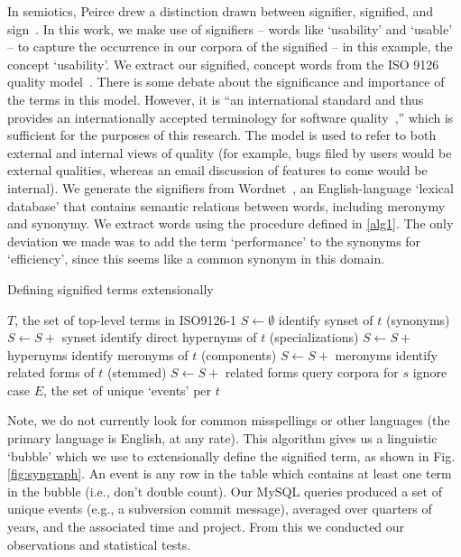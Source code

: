\documentclass[conference, compsoc]{IEEEtran}
\begin{document}
In semiotics, Peirce drew a distinction drawn between signifier, signified, and sign~\cite{atkin2006}. In this work, we make use of signifiers -- words like `usability' and `usable' -- to capture the occurrence in our corpora of the signified -- in this example, the concept `usability'. We extract our signified, concept words from the ISO 9126 quality model~\cite{iso9126}. There is some debate about the significance and importance of the terms in this model. However, it is ``an international standard and thus provides an internationally accepted terminology for software quality~\cite[p. 58]{Boegh2008},'' which is sufficient for the purposes of this research. The model is used to refer to both external and internal views of quality (for example, bugs filed by users would be external qualities, whereas an email discussion of features to come would be internal). We generate the signifiers from Wordnet~\cite{Fellbaum1998}, an English-language `lexical database' that contains semantic relations between words, including meronymy and synonymy. We extract words using the procedure defined in \ref{alg1}. The only deviation we made was to add the term `performance' to the synonyms for `efficiency', since this seems like a common synonym in this domain.%

\renewcommand{\algorithmiccomment}[1]{// #1}
\begin{algorithm}[H]
\caption{Defining signified terms extensionally}
  \label{alg1}
\begin{algorithmic}
	\REQUIRE $T$, the set of top-level terms in ISO9126-1
	\STATE $S \leftarrow \emptyset $
	\STATE identify synset of $t$ (synonyms)%
	\STATE $S \leftarrow S +$ synset
	\STATE identify direct hypernyms of $t$ (specializations)%
	\STATE $S \leftarrow S +$ hypernyms %
	\STATE identify meronyms of $t$ (components)%
	\STATE $S \leftarrow S +$ meronyms %
	\STATE identify related forms of $t$ (stemmed)%
	\STATE $S \leftarrow S +$ related forms
		\STATE query corpora for $s$
		\COMMENT ignore case
	\ENDFOR
  \ENDFOR
\RETURN $E$, the set of unique `events' per $t$

\end{algorithmic}
\end{algorithm}
Note, we do not currently look for common misspellings or other languages (the primary language is English, at any rate). This algorithm gives us a linguistic `bubble' which we use to extensionally define the signified term, as shown in Fig. \ref{fig:syngraph}. An event is any row in the table which contains at least one term in the bubble (i.e., don't double count). Our MySQL queries produced a set of unique events (e.g., a subversion commit message), averaged over quarters of years, and the associated time and project. From this we conducted our observations and statistical tests.
\end{document}
